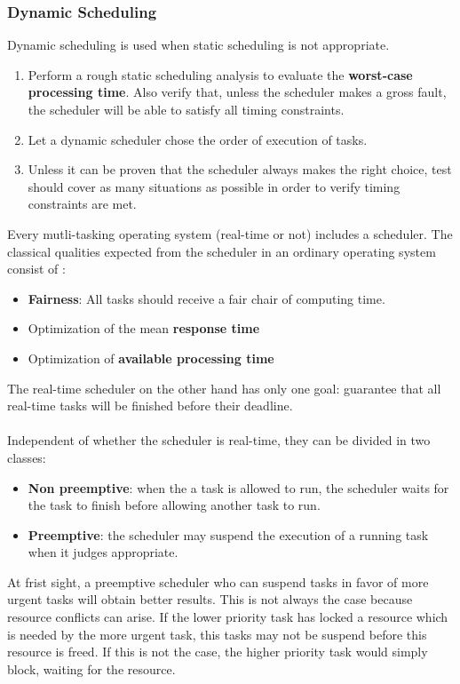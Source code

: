 \documentclass[../main.tex]{subfiles}
\begin{document}
\subsubsection{Dynamic Scheduling}
Dynamic scheduling is used when static scheduling is not appropriate. 
\begin{enumerate}
	\item Perform a rough static scheduling analysis to evaluate the \textbf{worst-case processing time}. Also verify that, unless the scheduler makes a gross fault, the scheduler will be able to satisfy all timing constraints. 
	\item Let a dynamic scheduler chose the order of execution of tasks.
	\item Unless it can be proven that the scheduler always makes the right choice, test should cover as many situations as possible in order to verify timing constraints are met.
\end{enumerate}

Every mutli-tasking operating system (real-time or not) includes a scheduler. The classical qualities expected from the scheduler in an ordinary operating system consist of :
\begin{itemize}
	\item \textbf{Fairness}: All tasks should receive a fair chair of computing time.
	\item Optimization of the mean \textbf{response time} 
	\item Optimization of \textbf{available processing time} 
\end{itemize}
The real-time scheduler on the other hand has only one goal: guarantee that all real-time tasks will be finished before their deadline. 
\\\\
Independent of whether the scheduler is real-time, they can be divided in two classes:
\begin{itemize}
	\item \textbf{Non preemptive}: when the a task is allowed to run, the scheduler waits for the task to finish before allowing another task to run.
	\item \textbf{Preemptive}: the scheduler may suspend the execution of a running task when it judges appropriate.  
\end{itemize}

\begin{blockquote}
At frist sight, a preemptive scheduler who can suspend tasks in favor of more urgent tasks will obtain better results. This is not always the case because resource conflicts can arise. If  the lower priority task has locked a resource which is needed by the more urgent task, this tasks may not be suspend before this resource is freed. If this is not the case, the higher priority task would simply block, waiting for the resource.
\end{blockquote}
\end{document}
